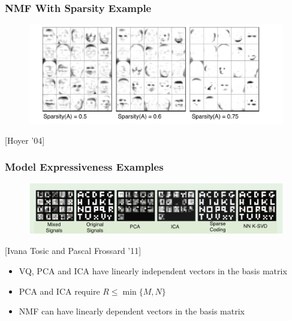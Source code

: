 \documentclass{beamer}
\begin{document}
\begin{frame}
\frametitle{NMF With Sparsity Example}
\begin{figure}[h]
  \centering
  \includegraphics[width=12cm,center]{hoyer}
\end{figure}
[Hoyer '04]
\end{frame}

\begin{frame}
\frametitle{Model Expressiveness Examples}
\begin{figure}
  \includegraphics[width=13cm,center]{nnmf_examples}
\end{figure}
[Ivana Tosic and Pascal Frossard '11]

\begin{itemize}
\item VQ, PCA and ICA have linearly independent vectors in the basis matrix
\item PCA and ICA require $R \le \min\{M, N\}$
\item NMF can have linearly dependent vectors in the basis matrix
\end{itemize}
\end{frame}
\end{document}
